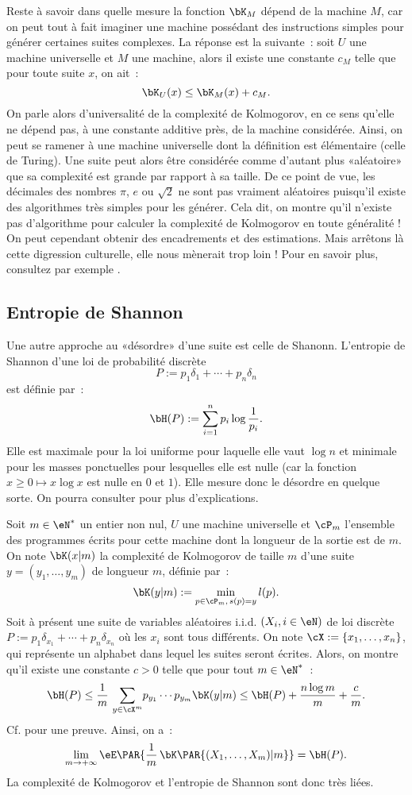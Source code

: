 Reste à savoir dans quelle mesure la fonction $\bK_M$ dépend de la machine
$M$, car on peut tout à fait imaginer une machine possédant des instructions
simples pour générer certaines suites complexes. La réponse est la suivante~:
soit $U$ une machine universelle et $M$ une machine, alors il existe une
constante $c_M$ telle que pour toute suite $x$, on ait~:
$$
\bK_U(x) \leq \bK_M(x)+c_M.
$$
On parle alors d'universalité de la complexité de Kolmogorov, en ce sens
qu'elle ne dépend pas, à une constante additive près, de la machine
considérée. Ainsi, on peut se ramener à une machine universelle dont la
définition est élémentaire (celle de Turing). Une suite peut alors être
considérée comme d'autant plus «aléatoire» que sa complexité est grande par
rapport à sa taille. De ce point de vue, les décimales des nombres $\pi$, $e$ ou
$\sqrt{2}$ ne sont pas vraiment aléatoires puisqu'il existe des algorithmes
très simples pour les générer. Cela dit, on montre qu'il n'existe pas
d'algorithme pour calculer la complexité de Kolmogorov en toute généralité !
On peut cependant obtenir des encadrements et des estimations. Mais arrêtons
là cette digression culturelle, elle nous mènerait trop loin ! Pour en savoir
plus, consultez par exemple \cite[chap. 7]{cover-thomas}.

\subsection{Entropie de Shannon}\label{ss:shannon}

Une autre approche au «désordre» d'une suite est celle de Shanonn. L'entropie
de Shannon d'une loi de probabilité discrète 
$$P:=p_1\delta_1+\cdots+p_n\delta_n$$
est définie par~:
$$
\bH(P):=\sum_{i=1}^n p_i\log \frac{1}{p_i}.
$$
Elle est maximale pour la loi uniforme pour laquelle elle vaut $\log n$ et
minimale pour les masses ponctuelles pour lesquelles elle est nulle (car la
fonction $x\geq 0\mapsto x\log x$ est nulle en $0$ et $1$). Elle mesure donc
le désordre en quelque sorte. On pourra consulter \cite[chap. 6]{applebaum}
pour plus d'explications.

Soit $m\in\eN^*$ un entier non nul, $U$ une machine universelle et $\cP_m$
l'ensemble des programmes écrits pour cette machine dont la longueur de la
sortie est de $m$. On note $\bK(x|m)$ la complexité de Kolmogorov de taille
$m$ d'une suite $y=(y_1,\ldots,y_m)$ de longueur $m$, définie par~:
$$
\bK(y|m):=\min_{p\in\cP_m,\,s(p)=y} l(p).
$$
Soit à présent une suite de variables aléatoires i.i.d. $(X_i,i\in\eN)$ de
loi discrète $P:=p_1\delta_{x_1}+\cdots+p_n\delta_{x_n}$ où les $x_i$ sont tous
différents. On note $\cX:=\{x_1,\ldots,x_n\}$, qui représente un alphabet dans lequel
les suites seront écrites. Alors, on montre qu'il existe une constante $c>0$
telle que pour tout $m\in\eN^*$~:
$$
\bH(P) \leq\frac{1}{m}\,\sum_{y\in\cX^m}\! p_{y_1}\cdots p_{y_m} \bK(y|m)
\leq\bH(P)+\frac{n\log m}{m}+\frac{c}{m}.
$$
Cf. \cite[théorème 7.3.1 page 154]{cover-thomas} pour une preuve. Ainsi, on
a~:
$$
\lim_{m\to+\infty}\eE\PAR{\frac{1}{m}\,\bK\PAR{(X_1,\ldots,X_m)|m}}=\bH(P).
$$
La complexité de Kolmogorov et l'entropie de Shannon sont donc très liées.


